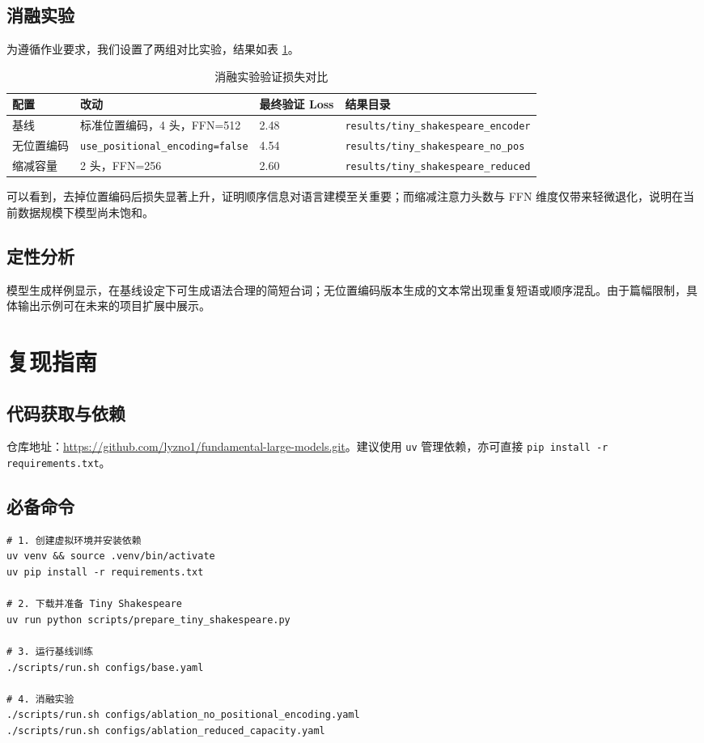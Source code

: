 \documentclass[12pt,a4paper]{article}
\begin{document}
\subsection{消融实验}
为遵循作业要求，我们设置了两组对比实验，结果如表 \ref{tab:ablation}。

\begin{table}[h]
\centering
\begin{tabular}{llll}
\toprule
\textbf{配置} & \textbf{改动} & \textbf{最终验证 Loss} & \textbf{结果目录} \\
\midrule
基线 & 标准位置编码，4 头，FFN=512 & 2.48 & \texttt{results/tiny\_shakespeare\_encoder} \\
无位置编码 & \texttt{use\_positional\_encoding=false} & 4.54 & \texttt{results/tiny\_shakespeare\_no\_pos} \\
缩减容量 & 2 头，FFN=256 & 2.60 & \texttt{results/tiny\_shakespeare\_reduced} \\
\bottomrule
\end{tabular}
\caption{消融实验验证损失对比}
\label{tab:ablation}
\end{table}

可以看到，去掉位置编码后损失显著上升，证明顺序信息对语言建模至关重要；而缩减注意力头数与 FFN 维度仅带来轻微退化，说明在当前数据规模下模型尚未饱和。

\subsection{定性分析}
模型生成样例显示，在基线设定下可生成语法合理的简短台词；无位置编码版本生成的文本常出现重复短语或顺序混乱。由于篇幅限制，具体输出示例可在未来的项目扩展中展示。

\section{复现指南}
\subsection{代码获取与依赖}
仓库地址：\url{https://github.com/lyzno1/fundamental-large-models.git}。建议使用 \texttt{uv} 管理依赖，亦可直接 \texttt{pip install -r requirements.txt}。

\subsection{必备命令}
\begin{verbatim}
# 1. 创建虚拟环境并安装依赖
uv venv && source .venv/bin/activate
uv pip install -r requirements.txt

# 2. 下载并准备 Tiny Shakespeare
uv run python scripts/prepare_tiny_shakespeare.py

# 3. 运行基线训练
./scripts/run.sh configs/base.yaml

# 4. 消融实验
./scripts/run.sh configs/ablation_no_positional_encoding.yaml
./scripts/run.sh configs/ablation_reduced_capacity.yaml
\end{verbatim}
\end{document}
